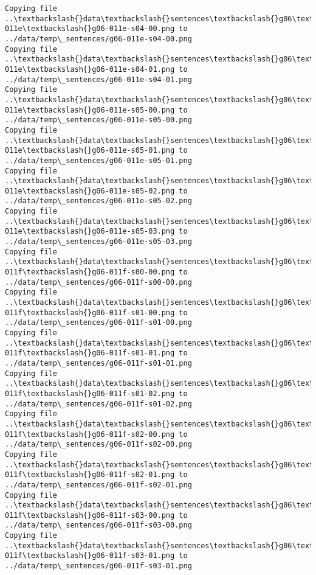 \documentclass[11pt]{article}
\begin{document}
\begin{Verbatim}[commandchars=\\\{\}]
Copying file ..\textbackslash{}data\textbackslash{}sentences\textbackslash{}g06\textbackslash{}g06-011e\textbackslash{}g06-011e-s04-00.png to
../data/temp\_sentences/g06-011e-s04-00.png
Copying file ..\textbackslash{}data\textbackslash{}sentences\textbackslash{}g06\textbackslash{}g06-011e\textbackslash{}g06-011e-s04-01.png to
../data/temp\_sentences/g06-011e-s04-01.png
Copying file ..\textbackslash{}data\textbackslash{}sentences\textbackslash{}g06\textbackslash{}g06-011e\textbackslash{}g06-011e-s05-00.png to
../data/temp\_sentences/g06-011e-s05-00.png
Copying file ..\textbackslash{}data\textbackslash{}sentences\textbackslash{}g06\textbackslash{}g06-011e\textbackslash{}g06-011e-s05-01.png to
../data/temp\_sentences/g06-011e-s05-01.png
Copying file ..\textbackslash{}data\textbackslash{}sentences\textbackslash{}g06\textbackslash{}g06-011e\textbackslash{}g06-011e-s05-02.png to
../data/temp\_sentences/g06-011e-s05-02.png
Copying file ..\textbackslash{}data\textbackslash{}sentences\textbackslash{}g06\textbackslash{}g06-011e\textbackslash{}g06-011e-s05-03.png to
../data/temp\_sentences/g06-011e-s05-03.png
Copying file ..\textbackslash{}data\textbackslash{}sentences\textbackslash{}g06\textbackslash{}g06-011f\textbackslash{}g06-011f-s00-00.png to
../data/temp\_sentences/g06-011f-s00-00.png
Copying file ..\textbackslash{}data\textbackslash{}sentences\textbackslash{}g06\textbackslash{}g06-011f\textbackslash{}g06-011f-s01-00.png to
../data/temp\_sentences/g06-011f-s01-00.png
Copying file ..\textbackslash{}data\textbackslash{}sentences\textbackslash{}g06\textbackslash{}g06-011f\textbackslash{}g06-011f-s01-01.png to
../data/temp\_sentences/g06-011f-s01-01.png
Copying file ..\textbackslash{}data\textbackslash{}sentences\textbackslash{}g06\textbackslash{}g06-011f\textbackslash{}g06-011f-s01-02.png to
../data/temp\_sentences/g06-011f-s01-02.png
Copying file ..\textbackslash{}data\textbackslash{}sentences\textbackslash{}g06\textbackslash{}g06-011f\textbackslash{}g06-011f-s02-00.png to
../data/temp\_sentences/g06-011f-s02-00.png
Copying file ..\textbackslash{}data\textbackslash{}sentences\textbackslash{}g06\textbackslash{}g06-011f\textbackslash{}g06-011f-s02-01.png to
../data/temp\_sentences/g06-011f-s02-01.png
Copying file ..\textbackslash{}data\textbackslash{}sentences\textbackslash{}g06\textbackslash{}g06-011f\textbackslash{}g06-011f-s03-00.png to
../data/temp\_sentences/g06-011f-s03-00.png
Copying file ..\textbackslash{}data\textbackslash{}sentences\textbackslash{}g06\textbackslash{}g06-011f\textbackslash{}g06-011f-s03-01.png to
../data/temp\_sentences/g06-011f-s03-01.png

\end{Verbatim}
\end{document}
